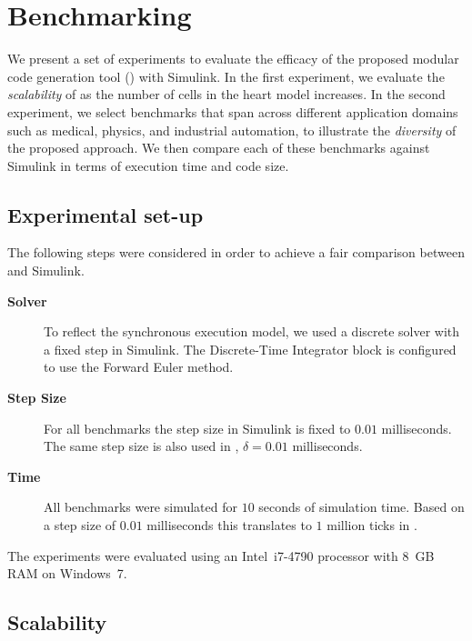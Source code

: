\section{Benchmarking}
\label{sec:benchmarking}


We present a set of experiments to evaluate the efficacy of the proposed modular code generation tool (\ourTool) with Simulink\textsuperscript{\textregistered}. 
In the first experiment, we evaluate the \emph{scalability} of \ourTool as the number of cells in the heart model increases. 
In the second experiment, we select benchmarks that span across different application domains such as medical, physics, and industrial automation, to illustrate the \emph{diversity} of the proposed approach.
We then compare each of these benchmarks against Simulink\textsuperscript{\textregistered} in terms of execution time and code size.


\subsection{Experimental set-up} 
The following steps were considered in order to achieve a fair comparison between \ourTool and Simulink\textsuperscript{\textregistered}.

\begin{description}
	\item[\textbf{Solver}] To reflect the synchronous execution model, we used a discrete solver with a fixed step in Simulink.
	The Discrete-Time Integrator block is configured to use the Forward Euler method.
	
	\item[\textbf{Step Size}] For all benchmarks the step size in Simulink\textsuperscript{\textregistered} is fixed to $0.01$ milliseconds.
	The same step size is also used in \ourTool, $\delta = 0.01$ milliseconds.
	
	\item[\textbf{Time}] All benchmarks were simulated for $10$ seconds of simulation time.
	Based on a step size of $0.01$ milliseconds this translates to $1$ million ticks in \ourTool.
\end{description}

The experiments were evaluated using an Intel~i7-4790 processor with 8~GB RAM on Windows~7. 


\subsection{Scalability}


